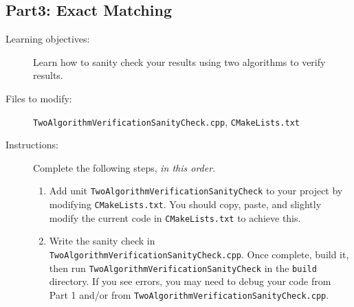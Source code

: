\documentclass[paper=a4, fontsize=11pt]{scrartcl} %
\numberwithin{equation}{section} %
\numberwithin{figure}{section} %
\numberwithin{table}{section} %
\begin{document}
\subsection*{Part3: Exact Matching}
\begin{description}
	\item[Learning objectives:] Learn how to sanity check your results using two algorithms to verify results.
	\item[Files to modify:] \texttt{TwoAlgorithmVerificationSanityCheck.cpp}, \texttt{CMakeLists.txt}
	\item[Instructions:] Complete the following steps, \textit{in this order}.
		\begin{enumerate}
			\item Add unit \texttt{TwoAlgorithmVerificationSanityCheck} to your project by modifying \texttt{CMakeLists.txt}. You should copy, paste, and slightly modify the current code in \texttt{CMakeLists.txt} to achieve this.	
			\item Write the sanity check in \texttt{TwoAlgorithmVerificationSanityCheck.cpp}. Once complete, build it, then run \texttt{TwoAlgorithmVerificationSanityCheck} in the \texttt{build} directory. If you see errors, you may need to debug your code from Part 1 and/or from \texttt{TwoAlgorithmVerificationSanityCheck.cpp}.		\end{enumerate}
\end{description}
\end{document}
